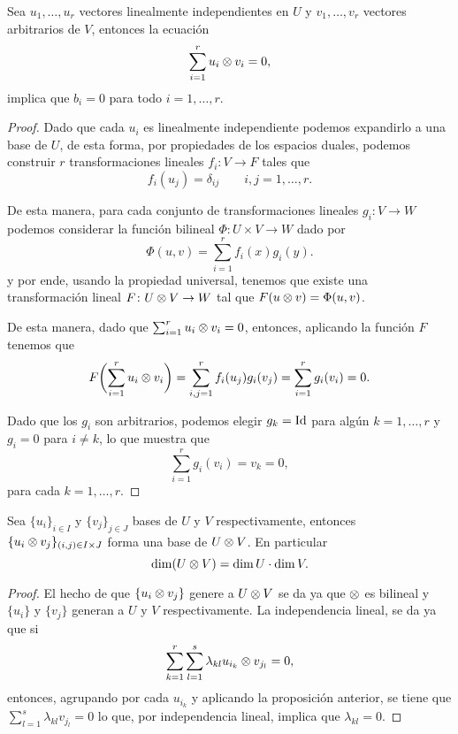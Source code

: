 \begin{lemma}\label{lemma:tensor-equal-zero}
  Sea $u_1,\ldots,u_r$ vectores linealmente independientes en $U$ y $v_1, \ldots,v_r$ vectores arbitrarios de $V$, entonces la ecuación
    \[
      \sum_{i=1}^r u_i \otimes v_i = 0,
    \]
  implica que $b_i = 0$ para todo $i=1,\ldots,r$.
\end{lemma}
\begin{proof}
  Dado que cada $u_i$ es linealmente independiente podemos expandirlo a una base de $U$, de esta forma, por propiedades de los espacios duales, podemos construir $r$ transformaciones lineales $f_i\colon V \to F$ tales que
    \[
      f_i(u_j) = \delta_{ij} \qquad i,j=1,\ldots,r.
    \]
  
    De esta manera, para cada conjunto de transformaciones lineales $g_i\colon V \to W$ podemos considerar la función bilineal $\Phi\colon U \times V \to W$ dado por
    \[
      \Phi(u,v) = \sum_{i=1}^r f_i(x) g_i(y).
    \]
    y por ende, usando la propiedad universal, tenemos que existe una transformación lineal $F\colon U \otimes V \to W$ tal que $F(u \otimes v) = \Phi(u,v)$.

    De esta manera, dado que $\sum_{i=1}^r u_i \otimes v_i = 0$, entonces, aplicando la función $F$ tenemos que
    \[
      F\biggl(\sum_{i=1}^r u_i \otimes v_i \biggr) = \sum_{i,j=1}^r f_i(u_j)g_i(v_j) = \sum_{i=1}^r g_i(v_i) = 0.
    \]

    Dado que los $g_i$ son arbitrarios, podemos elegir $g_k = \mathrm{Id}$ para algún $k=1,\ldots,r$ y $g_i = 0$ para $i \neq k$, lo que muestra que
    \[
      \sum_{i=1}^r g_i(v_i) = v_k = 0,
    \]
    para cada $k=1,\ldots,r$.
\end{proof}

\begin{corollary}
  Sea $\{u_i\}_{i\in I}$ y $\{v_j\}_{j\in J}$ bases de $U$ y $V$ respectivamente, entonces $\{u_i \otimes v_j\}_{(i,j)\in I \times J}$ forma una base de $U \otimes V$. En particular 
  \[
    \dim(U\otimes V) = \dim U \cdot \dim V.
  \]
\end{corollary}
\begin{proof}
  El hecho de que $\{u_i \otimes v_j\}$ genere a $U \otimes V$ se da ya que $\otimes$ es bilineal y $\{u_i\}$ y $\{v_j\}$ generan a $U$ y $V$ respectivamente. La independencia lineal, se da ya que si
  \[
    \sum_{k=1}^r\sum_{l=1}^s \lambda_{kl} u_{i_k} \otimes v_{j_l} = 0,
  \]
  entonces, agrupando por cada $u_{i_k}$ y aplicando la proposición anterior, se tiene que $\sum_{l=1}^s \lambda_{kl} v_{j_l}=0$ lo que, por independencia lineal, implica que $\lambda_{kl}=0$.
\end{proof}

